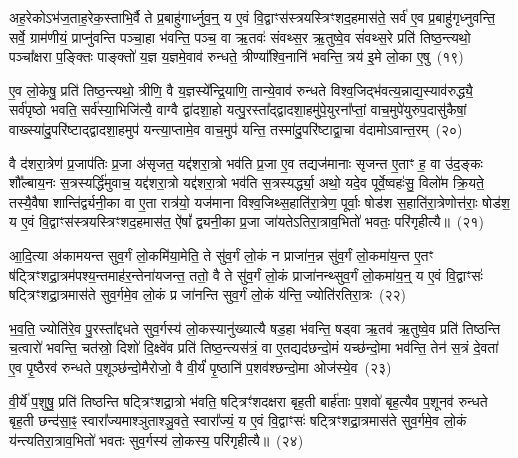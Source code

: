 अह॒रेको\-ऽभ॑ज॒ताह॒रेक॒स्ताभि॒र्वै ते प्र॒बाहु॑गार्ध्नुव॒न्॒ य ए॒वं वि॒द्वाꣳस॑स्त्रयस्त्रिꣳशद॒हमास॑ते॒ सर्व॑ ए॒व प्र॒बाहु॑गृध्नुवन्ति॒ सर्वे॒ ग्राम॑णीयं॒ प्राप्नु॑वन्ति पञ्चा॒हा भ॑वन्ति॒ पञ्च॒ वा ऋ॒तवः॑ संवथ्स॒र ऋ॒तुष्वे॒व सं॑वथ्स॒रे प्रति॑ तिष्ठ॒न्त्यथो॒ पञ्चा᳚क्षरा प॒ङ्क्तिः पाङ्क्तो॑ य॒ज्ञ य॒ज्ञमे॒वाव॑ रुन्धते॒ त्रीण्या᳚श्वि॒नानि॑ भवन्ति॒ त्रय॑ इ॒मे लो॒का ए॒षु~(१९)\ip

ए॒व लो॒केषु॒ प्रति॑ तिष्ठ॒न्त्यथो॒ त्रीणि॒ वै य॒ज्ञस्ये᳚न्द्रि॒याणि॒ तान्ये॒वाव॑ रुन्धते विश्व॒जिद्भ॑वत्य॒न्नाद्य॒स्याव॑रुद्ध्यै॒ सर्व॑पृष्ठो भवति॒ सर्व॑स्या॒भिजि॑त्यै॒ वाग्वै द्वा॑दशा॒हो यत्पु॒रस्ता᳚द्द्वादशा॒हमु॑पे॒युरना᳚प्तां॒ वाच॒मुपे॑युरुप॒दासु॑कैषां॒ वाख्स्या॑दु॒परि॑ष्टाद्द्वादशा॒हमुप॑ यन्त्या॒प्तामे॒व वाच॒मुप॑ यन्ति॒ तस्मा॑दु॒परि॑ष्टाद्वा॒चा व॑दामो\-ऽवान्त॒रम्~(२०)\ip

वै द॑शरा॒त्रेण॑ प्र॒जा\-प॑तिः प्र॒जा अ॑सृजत॒ यद्द॑शरा॒त्रो भव॑ति प्र॒जा ए॒व तद्यज॑मानाः सृजन्त ए॒ताꣳ ह॒ वा उ॑द॒ङ्कः शौ᳚ल्बाय॒नः स॒त्रस्यर्द्धि॑मुवाच॒ यद्द॑शरा॒त्रो यद्द॑शरा॒त्रो भव॑ति स॒त्रस्यर्द्ध्या॒ अथो॒ यदे॒व पूर्वे॒ष्वहः॑सु॒ विलो॑म क्रि॒यते॒ तस्यै॒वैषा शान्ति॑र्द्व्यनी॒का वा ए॒ता रात्र॑यो॒ यज॑माना विश्व॒जिथ्स॒हाति॑रा॒त्रेण॒ पूर्वाः॒ षोड॑श स॒हाति॑रा॒त्रेणोत्त॑राः॒ षोड॑श॒ य ए॒वं वि॒द्वाꣳस॑स्त्रयस्त्रिꣳशद॒हमास॑त॒ ऐ॑षां᳚ द्व्यनी॒का प्र॒जा जा॑यते\-ऽतिरा॒त्राव॒भितो॑ भवतः॒ परि॑गृहीत्यै॥~(२१)\ip

{\anuvakamend[{अ॒ह॒र॒न्ने॒ष्व॑वान्त॒रꣳ षोड॑श स॒ह स॒प्तद॑श च}]}

आ॒दि॒त्या अ॑कामयन्त सुव॒र्गं लो॒कमि॑या॒मेति॒ ते सु॑व॒र्गं लो॒कं न प्राजा॑न॒न्न सु॑व॒र्गं लो॒कमा॑य॒न्त ए॒तꣳ ष॑ट्त्रिꣳशद्रा॒त्रम॑पश्य॒न्तमाह॑र॒न्तेना॑यजन्त॒ ततो॒ वै ते सु॑व॒र्गं लो॒कं प्राजा॑नन्थ्सुव॒र्गं लो॒कमा॑य॒न्॒ य ए॒वं वि॒द्वाꣳसः॑ षट्त्रिꣳशद्रा॒त्रमास॑ते सुव॒र्गमे॒व लो॒कं प्र जा॑नन्ति सुव॒र्गं लो॒कं य॑न्ति॒ ज्योति॑रतिरा॒त्रः~(२२)\ip

भ॒व॒ति॒ ज्योति॑रे॒व पु॒रस्ता᳚द्दधते सुव॒र्गस्य॑ लो॒कस्यानु॑ख्यात्यै षड॒हा भ॑वन्ति॒ षड्वा ऋ॒तव॑ ऋ॒तुष्वे॒व प्रति॑ तिष्ठन्ति च॒त्वारो॑ भवन्ति॒ चत॑स्रो॒ दिशो॑ दि॒क्ष्वे॑व प्रति॑ तिष्ठ॒न्त्यस॑त्रं॒ वा ए॒तद्यद॑छन्दो॒मं यच्छ॑न्दो॒मा भव॑न्ति॒ तेन॑ स॒त्रं दे॒वता॑ ए॒व पृ॒ष्ठैरव॑ रुन्धते प॒शूञ्छ॑न्दो॒मैरोजो॒ वै वी॒र्यं॑ पृ॒ष्ठानि॑ प॒शव॑श्छन्दो॒मा ओज॑स्ये॒व~(२३)\ip

वी॒र्ये॑ प॒शुषु॒ प्रति॑ तिष्ठन्ति षट्त्रिꣳशद्रा॒त्रो भ॑वति॒ षट्त्रिꣳ॑शदक्षरा बृह॒ती बार्\mbox{}ह॑ताः प॒शवो॑ बृह॒त्यैव प॒शूनव॑ रुन्धते बृह॒ती छन्द॑सा॒ꣴ॒ स्वारा᳚ज्यमाश्ञुताश्ञु॒वते॒ स्वारा᳚ज्यं॒ य ए॒वं वि॒द्वाꣳसः॑ षट्त्रिꣳशद्रा॒त्रमास॑ते सुव॒र्गमे॒व लो॒कं य॑न्त्यतिरा॒त्राव॒भितो॑ भवतः सुव॒र्गस्य॑ लो॒कस्य॒ परि॑गृहीत्यै॥~(२४)\ip

